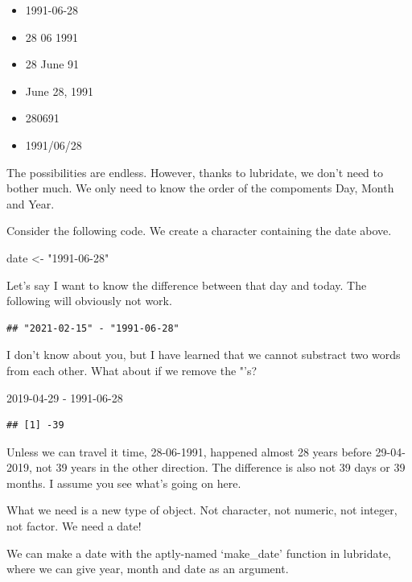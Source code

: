 \documentclass[]{tufte-book}
\newenvironment{Shaded}{}{}
\newcommand{\DecValTok}[1]{\textcolor[rgb]{0.25,0.63,0.44}{#1}}
\newcommand{\NormalTok}[1]{#1}
\newcommand{\OperatorTok}[1]{\textcolor[rgb]{0.40,0.40,0.40}{#1}}
\newcommand{\StringTok}[1]{\textcolor[rgb]{0.25,0.44,0.63}{#1}}
\providecommand{\tightlist}{%
  \setlength{\itemsep}{0pt}\setlength{\parskip}{0pt}}
\begin{document}
\begin{itemize}
\tightlist
\item
  1991-06-28
\item
  28 06 1991
\item
  28 June 91
\item
  June 28, 1991
\item
  280691
\item
  1991/06/28
\end{itemize}

The possibilities are endless. However, thanks to lubridate, we don't need to bother much. We only need to know the order of the compoments Day, Month and Year.

Consider the following code. We create a character containing the date above.

\begin{Shaded}
\begin{Highlighting}[]
\NormalTok{date <-}\StringTok{ "1991-06-28"}
\end{Highlighting}
\end{Shaded}

Let's say I want to know the difference between that day and today. The following will obviously not work.

\begin{verbatim}
## "2021-02-15" - "1991-06-28"
\end{verbatim}

I don't know about you, but I have learned that we cannot substract two words from each other. What about if we remove the "'s?

\begin{Shaded}
\begin{Highlighting}[]
\DecValTok{2019-04-29} \OperatorTok{-}\StringTok{ }\DecValTok{1991-06-28}
\end{Highlighting}
\end{Shaded}

\begin{verbatim}
## [1] -39
\end{verbatim}

Unless we can travel it time, 28-06-1991, happened almost 28 years before 29-04-2019, not 39 years in the other direction. The difference is also not 39 days or 39 months. I assume you see what's going on here.

What we need is a new type of object. Not character, not numeric, not integer, not factor. We need a date!

We can make a date with the aptly-named `make\_date' function in lubridate, where we can give year, month and date as an argument.
\end{document}
